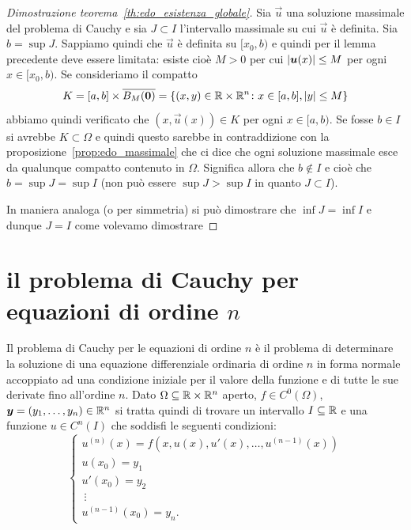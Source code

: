 \begin{proof}[Dimostrazione teorema~\ref{th:edo_esistenza_globale}]
Sia $\vec u$ una soluzione massimale del problema di Cauchy e sia
$J\subset I$ l'intervallo massimale su cui $\vec u$ è definita.
Sia $b=\sup J$. Sappiamo quindi che $\vec u$ è definita su $[x_0,b)$
e quindi per il lemma precedente deve essere limitata: esiste cioè
$M>0$ per cui ${\left|\boldsymbol u(x)\right|}\le M$ per ogni $x\in[x_0,b)$.
Se consideriamo il compatto
\[
K=[a,b] \times \overline{B_M(\boldsymbol 0)}
 = {\left\{ (x,y)\in {\mathbb R} \times {\mathbb R}^n\colon x\in [a,b], {\left|y\right|}\le M \right\}}
\]
abbiamo quindi verificato che $(x,\vec u(x))\in K$ per ogni $x\in [a,b)$.
Se fosse $b\in I$ si avrebbe $K\subset \Omega$ e quindi questo sarebbe
in contraddizione con la proposizione~\ref{prop:edo_massimale} che
ci dice che ogni soluzione massimale esce da qualunque compatto contenuto
in $\Omega$. Significa allora che $b\not \in I$ e cioè che $b = \sup J = \sup I$
(non può essere $\sup J>\sup I$ in quanto $J\subset I$).

In maniera analoga (o per simmetria) si può dimostrare che $\inf J=\inf I$
e dunque $J=I$ come volevamo dimostrare
\end{proof}

\section{il problema di Cauchy per equazioni di ordine $n$}

Il problema di Cauchy per le equazioni di ordine $n$ è il problema di
determinare la soluzione di una equazione differenziale ordinaria di ordine $n$
in forma normale accoppiato ad una condizione iniziale per il valore della
funzione e di tutte le sue derivate fino all'ordine $n$.
Dato $\Omega\subseteq {\mathbb R}\times {\mathbb R}^n$ aperto, $f\in C^0(\Omega)$,
$\boldsymbol y = (y_1, \dots, y_n) \in {\mathbb R}^n$
si tratta quindi di trovare un intervallo $I\subseteq {\mathbb R}$ e una funzione
$u\in C^n(I)$ che soddisfi le seguenti condizioni:
\begin{equation}\label{eq:problema_cauchy_ordine_n}
  \begin{cases}
    u^{(n)}(x) = f(x,u(x), u'(x), \dots, u^{(n-1)}(x))\\
    u(x_0) = y_1 \\
    u'(x_0) = y_2 \\
    \ \vdots \\
    u^{(n-1)}(x_0) = y_n.
  \end{cases}
\end{equation}

